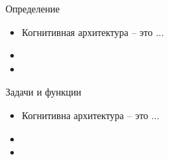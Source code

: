 \documentclass{beamer}
\begin{document}
%

%


\begin{frame}{Определение}
\begin{itemize}
	\item Когнитивная архитектура -- это ...
	\medskip
	\item 
	\medskip
	\item  
\end{itemize}
\end{frame}

\begin{frame}{Задачи и функции}
\begin{itemize}
	\item Когнитивна архитектура -- это ...
	\medskip
	\item 
	\medskip
	\item  
\end{itemize}
\end{frame}
\end{document}
